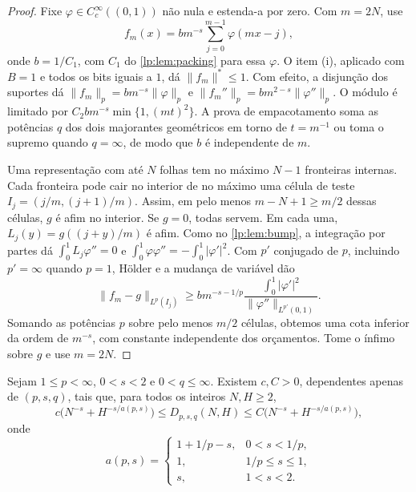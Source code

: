\documentclass[12pt,a4paper]{article}
\begin{document}
\begin{proof}
Fixe $\varphi\in C_c^\infty((0,1))$ não nula e estenda-a por zero. Com $m=2N$, use
\[
 f_m(x)=b m^{-s}\sum_{j=0}^{m-1}\varphi(mx-j),
\]
onde $b=1/C_1$, com $C_1$ do \cref{lp:lem:packing} para essa $\varphi$. O item (i), aplicado com $B=1$ e todos os bits iguais a $1$, dá $\|f_m\|^*\le1$. Com efeito, a disjunção dos suportes dá $\|f_m\|_p=b m^{-s}\|\varphi\|_p$ e $\|f_m''\|_p=b m^{2-s}\|\varphi''\|_p$. O módulo é limitado por $C_2 b m^{-s}\min\{1,(mt)^2\}$. A prova de empacotamento soma as potências $q$ dos dois majorantes geométricos em torno de $t=m^{-1}$ ou toma o supremo quando $q=\infty$, de modo que $b$ é independente de $m$.

Uma representação com até $N$ folhas tem no máximo $N-1$ fronteiras internas. Cada fronteira pode cair no interior de no máximo uma célula de teste $I_j=(j/m,(j+1)/m)$. Assim, em pelo menos $m-N+1\ge m/2$ dessas células, $g$ é afim no interior. Se $g=0$, todas servem. Em cada uma, $L_j(y)=g((j+y)/m)$ é afim. Como no \cref{lp:lem:bump}, a integração por partes dá $\int_0^1 L_j\varphi''=0$ e $\int_0^1\varphi\varphi''=-\int_0^1|\varphi'|^2$. Com $p'$ conjugado de $p$, incluindo $p'=\infty$ quando $p=1$, Hölder e a mudança de variável dão
\[
 \|f_m-g\|_{L^p(I_j)}
 \ge b m^{-s-1/p}\frac{\int_0^1|\varphi'|^2}{\|\varphi''\|_{L^{p'}(0,1)}} .
\]
Somando as potências $p$ sobre pelo menos $m/2$ células, obtemos uma cota inferior da ordem de $m^{-s}$, com constante independente dos orçamentos. Tome o ínfimo sobre $g$ e use $m=2N$.
\end{proof}

\begin{teorema}
\label{lp:thm:minimax-nh}
Sejam $1\le p<\infty$, $0<s<2$ e $0<q\le\infty$. Existem $c,C>0$, dependentes apenas de $(p,s,q)$, tais que, para todos os inteiros $N,H\ge2$,
\begin{equation}
 c\bigl(N^{-s}+H^{-s/a(p,s)}\bigr)
 \le D_{p,s,q}(N,H)\le C\bigl(N^{-s}+H^{-s/a(p,s)}\bigr),
 \label{lp:eq:minimax-nh}
\end{equation}
onde
\[
 a(p,s)=
 \begin{cases}
 1+1/p-s,&0<s<1/p,\\
 1,&1/p\le s\le1,\\
 s,&1<s<2.
 \end{cases}
\]
\end{teorema}
\end{document}
